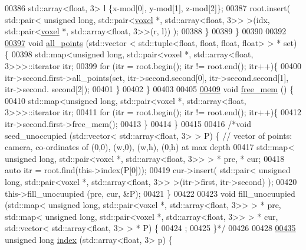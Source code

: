 \begin{DoxyCode}
00386             std::array<float, 3> l \{x-mod[0], y-mod[1], z-mod[2]\};
00387             root.insert( std::pair< \textcolor{keywordtype}{unsigned} \textcolor{keywordtype}{long}, std::pair<\hyperlink{classvoxel}{voxel} *, std::array<float, 3>> >(idx, 
      std::pair<\hyperlink{classvoxel}{voxel} *, std::array<float, 3>>(r, l)) );
00388         \}
00389     \}
00390 
00392 
\hypertarget{Voxel_8hpp_source.tex_l00397}{}\hyperlink{classocc__grid_a8b47af213fb57bf31c21ab1a9ef36505}{00397}     \textcolor{keywordtype}{void} \hyperlink{classocc__grid_a8b47af213fb57bf31c21ab1a9ef36505}{all\_points} (std::vector < std::tuple<float, float, float, float> > * \textcolor{keyword}{set}) \{
00398         std::map<unsigned long, std::pair<voxel *, std::array<float, 3>>>::iterator itr;
00399         \textcolor{keywordflow}{for} (itr = root.begin(); itr != root.end(); itr++)\{
00400             itr->second.first->all\_points(\textcolor{keyword}{set}, itr->second.second[0], itr->second.second[1], itr->second.
      second[2]);
00401         \}
00402     \}
00403 
00405 
\hypertarget{Voxel_8hpp_source.tex_l00409}{}\hyperlink{classocc__grid_adbfab59a1fb247d53a993fd9a2a26d67}{00409}     \textcolor{keywordtype}{void} \hyperlink{classocc__grid_adbfab59a1fb247d53a993fd9a2a26d67}{free\_mem} () \{
00410         std::map<unsigned long, std::pair<voxel *, std::array<float, 3>>>::iterator itr;
00411         \textcolor{keywordflow}{for} (itr = root.begin(); itr != root.end(); itr++)\{
00412             itr->second.first->free\_mem();
00413         \}
00414     \}
00415 
00416     \textcolor{comment}{/*void seed\_unoccupied (std::vector< std::array<float, 3> > P) \{ // vector of points: camera,
       co-ordinates of (0,0), (w,0), (w,h), (0,h) at max depth}
00417 \textcolor{comment}{        std::map< unsigned long, std::pair<voxel *, std::array<float, 3>> > * pre, * cur;}
00418 \textcolor{comment}{        auto itr = root.find(this->index(P[0]));}
00419 \textcolor{comment}{        cur->insert( std::pair< unsigned long, std::pair<voxel *, std::array<float, 3>> >(itr->first,
       itr->second) );}
00420 \textcolor{comment}{        this->fill\_unocuupied (pre, cur, &P);}
00421 \textcolor{comment}{    \}}
00422 \textcolor{comment}{}
00423 \textcolor{comment}{    void fill\_unocuupied (std::map< unsigned long, std::pair<voxel *, std::array<float, 3>> > * pre,
       std::map< unsigned long, std::pair<voxel *, std::array<float, 3>> > * cur, std::vector< std::array<float, 3> > *
       P) \{}
00424 \textcolor{comment}{        ;}
00425 \textcolor{comment}{    \}*/}
00426 
00428 
\hypertarget{Voxel_8hpp_source.tex_l00435}{}\hyperlink{classocc__grid_a0fb045d82217675decfc9b9289ad35ea}{00435}     \textcolor{keywordtype}{unsigned} \textcolor{keywordtype}{long} \hyperlink{classocc__grid_a0fb045d82217675decfc9b9289ad35ea}{index} (std::array<float, 3> p) \{

\end{DoxyCode}
